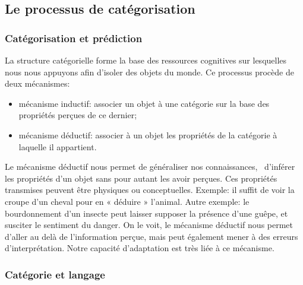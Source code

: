 \subsection{Le processus de catégorisation}
\label{sec:ch3_categoProcess}

\subsubsection{Catégorisation et prédiction}
\label{sec:ch3_categoPred}

La structure catégorielle forme la base des ressources cognitives sur lesquelles nous nous appuyons afin d'isoler des objets du monde. Ce processus procède de deux mécanismes:

\begin{itemize} 
\item mécanisme inductif: associer un objet à une catégorie sur la base des propriétés perçues de ce dernier;
\item mécanisme déductif: associer à un objet les propriétés de la catégorie à laquelle il appartient.
\end{itemize}

Le mécanisme déductif nous permet de généraliser nos connaissances, \ie~d'inférer les propriétés d'un objet sans pour autant les avoir perçues. Ces propriétés transmises peuvent être physiques ou conceptuelles. Exemple: il suffit de voir la croupe d'un cheval pour en « déduire » l'animal. Autre exemple: le bourdonnement d'un insecte peut laisser supposer la présence d'une guêpe, et susciter le sentiment du danger. On le voit, le mécanisme déductif nous permet d'aller au delà de l'information perçue, mais peut également mener à des erreurs d'interprétation. Notre capacité d’adaptation est très liée à ce mécanisme.

\subsubsection{Catégorie et langage}
\label{sec:ch3_catLang}



